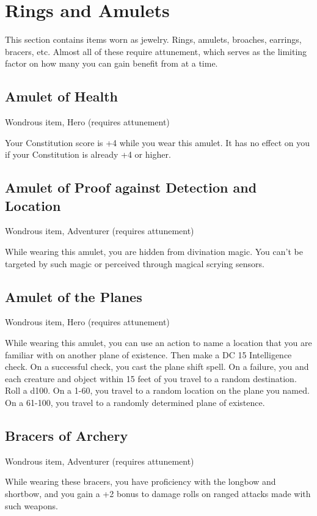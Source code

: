 \section{Rings and Amulets}\label{mi:rings}

This section contains items worn as jewelry. Rings, amulets, broaches, earrings, bracers, etc. Almost all of these require attunement, which serves as the limiting factor on how many you can gain benefit from at a time.

\subsection{Amulet of Health}
Wondrous item, Hero (requires attunement)

Your Constitution score is +4 while you wear this amulet. It has no effect on you if your Constitution is already +4 or higher.

\subsection{Amulet of Proof against Detection and Location}
Wondrous item, Adventurer (requires attunement)

While wearing this amulet, you are hidden from divination magic. You can't be targeted by such magic or perceived through magical scrying sensors.

\subsection{Amulet of the Planes}
Wondrous item, Hero (requires attunement)

While wearing this amulet, you can use an action to name a location that you are familiar with on another plane of existence. Then make a DC 15 Intelligence check. On a successful check, you cast the plane shift spell. On a failure, you and each creature and object within 15 feet of you travel to a random destination. Roll a d100. On a 1-60, you travel to a random location on the plane you named. On a 61-100, you travel to a randomly determined plane of existence.

\subsection{Bracers of Archery}
Wondrous item, Adventurer (requires attunement)

While wearing these bracers, you have proficiency with the longbow and shortbow, and you gain a +2 bonus to damage rolls on ranged attacks made with such weapons.

